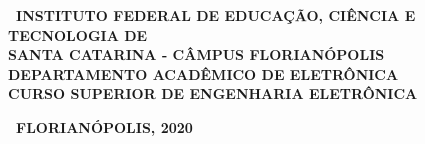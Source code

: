 \documentclass{ifscTCC} %
\begin{document}
\newcommand{\numpy}{\textit{numpy}\xspace}
\newcommand{\VCS}{\textit{VCS}\xspace}
\newcommand{\Python}{\textit{Python 3}\xspace}
\newcommand{\Git}{\textit{Git\xspace}}
\newcommand{\GitHub}{\textit{GitHub\xspace}}
\newcommand{\magpylib}{\textit{magpylib}\xspace}
\newcommand{\Collections}{\textit{Collections}\xspace}
\newcommand{\Collection}{\textit{Collection}\xspace}
\newcommand{\software}{\textit{software}\xspace}
\newcommand{\matplotlib}{\textit{matplotlib}\xspace}
\newcommand{\ReadTheDocs}{\textit{ReadTheDocs}\xspace}
\newcommand{\Sphinx}{\textit{Sphinx}\xspace}
\newcommand{\PyPi}{\textit{PyPi}\xspace}
\newcommand{\docstring}{\textit{docstring}\xspace}

\frenchspacing 

\begin{capa}%
    \begin{SingleSpacing}
        \center\ABNTEXchapterfont\bfseries\ INSTITUTO FEDERAL DE EDUCAÇÃO, CIÊNCIA E TECNOLOGIA DE\\SANTA CATARINA - CÂMPUS FLORIANÓPOLIS\\DEPARTAMENTO ACADÊMICO DE ELETRÔNICA\\CURSO SUPERIOR DE ENGENHARIA ELETRÔNICA
        
        \vspace*{3.0cm}     %
        
        \ABNTEXchapterfont\bfseries\MakeUppercase\imprimirautor

        \begin{vplace}[0.5]
            \begin{center}
                \ABNTEXchapterfont\SingleSpacing\bfseries\Large\MakeUppercase\imprimirtitulo
            \end{center}
        \end{vplace}
        
        \begin{center}
            \ABNTEXchapterfont\bfseries\ FLORIANÓPOLIS, 2020
        \end{center}
    \end{SingleSpacing}
\end{capa}
\end{document}

